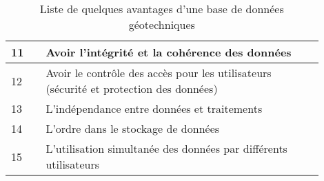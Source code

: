 \begin{table}
\begin{tabular}{|p{0.10\linewidth}|p{0.80\linewidth}|}
                    \\
                \hline 
                    11 &
                    Avoir l'intégrité et la cohérence des données
                    \\
                \hline 
                    12 &
                    Avoir le contrôle des accès pour les utilisateurs (sécurité et protection des données)
                    \\
                \hline 
                    13 &
                    L'indépendance entre données et traitements
                    \\
                \hline 
                    14 &
                    L'ordre dans le stockage de données
                    \\
                \hline 
                    15 &
                    L'utilisation simultanée des données par différents utilisateurs
                    \\
            \hline 
        \end{tabular}
        \caption{Liste de quelques avantages d'une base de données géotechniques} \label{tab:avantages}
\end{table}
\par
